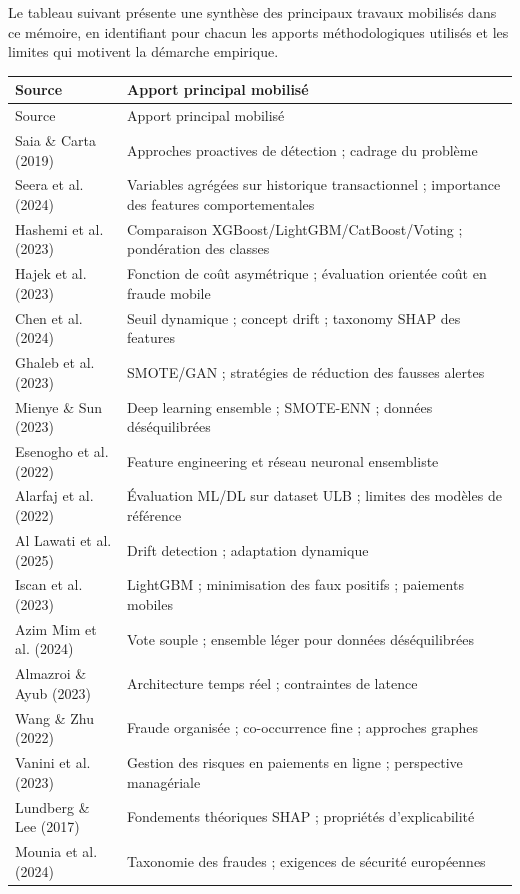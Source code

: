Le tableau suivant présente une synthèse des principaux travaux mobilisés dans ce mémoire, en identifiant pour chacun les apports méthodologiques utilisés et les limites qui motivent la démarche empirique.

\begin{longtable}{|p{}|p{}|}
\hline
Source & Apport principal mobilisé \\
\hline
\endfirsthead
\hline
Source & Apport principal mobilisé \\
\hline
\endhead
Saia \& Carta (2019) & Approches proactives de détection ; cadrage du problème \\
\hline
Seera et al. (2024) & Variables agrégées sur historique transactionnel ; importance des features comportementales \\
\hline
Hashemi et al. (2023) & Comparaison XGBoost/LightGBM/CatBoost/Voting ; pondération des classes \\
\hline
Hajek et al. (2023) & Fonction de coût asymétrique ; évaluation orientée coût en fraude mobile \\
\hline
Chen et al. (2024) & Seuil dynamique ; concept drift ; taxonomy SHAP des features \\
\hline
Ghaleb et al. (2023) & SMOTE/GAN ; stratégies de réduction des fausses alertes \\
\hline
Mienye \& Sun (2023) & Deep learning ensemble ; SMOTE-ENN ; données déséquilibrées \\
\hline
Esenogho et al. (2022) & Feature engineering et réseau neuronal ensembliste \\
\hline
Alarfaj et al. (2022) & Évaluation ML/DL sur dataset ULB ; limites des modèles de référence \\
\hline
Al Lawati et al. (2025) & Drift detection ; adaptation dynamique \\
\hline
Iscan et al. (2023) & LightGBM ; minimisation des faux positifs ; paiements mobiles \\
\hline
Azim Mim et al. (2024) & Vote souple ; ensemble léger pour données déséquilibrées \\
\hline
Almazroi \& Ayub (2023) & Architecture temps réel ; contraintes de latence \\
\hline
Wang \& Zhu (2022) & Fraude organisée ; co-occurrence fine ; approches graphes \\
\hline
Vanini et al. (2023) & Gestion des risques en paiements en ligne ; perspective managériale \\
\hline
Lundberg \& Lee (2017) & Fondements théoriques SHAP ; propriétés d'explicabilité \\
\hline
Mounia et al. (2024) & Taxonomie des fraudes ; exigences de sécurité européennes \\
\hline
\end{longtable}

